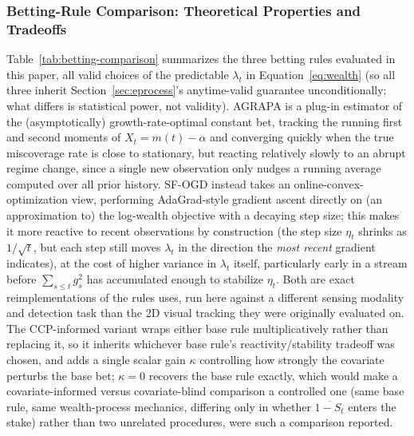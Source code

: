 \subsubsection{Betting-Rule Comparison: Theoretical Properties and Tradeoffs}
\label{sec:betting-comparison}
Table~\ref{tab:betting-comparison} summarizes the three betting rules evaluated in this paper, all valid choices of the predictable $\lambda_t$ in Equation~\ref{eq:wealth} (so all three inherit Section~\ref{sec:eprocess}'s anytime-valid guarantee unconditionally; what differs is statistical power, not validity). AGRAPA is a plug-in estimator of the (asymptotically) growth-rate-optimal constant bet, tracking the running first and second moments of $X_t = m(t)-\alpha$ and converging quickly when the true miscoverage rate is close to stationary, but reacting relatively slowly to an abrupt regime change, since a single new observation only nudges a running average computed over all prior history. SF-OGD instead takes an online-convex-optimization view, performing AdaGrad-style gradient ascent directly on (an approximation to) the log-wealth objective with a decaying step size; this makes it more reactive to recent observations by construction (the step size $\eta_t$ shrinks as $1/\sqrt{t}$, but each step still moves $\lambda_t$ in the direction the \emph{most recent} gradient indicates), at the cost of higher variance in $\lambda_t$ itself, particularly early in a stream before $\sum_{s\le t} g_s^2$ has accumulated enough to stabilize $\eta_t$. Both are exact reimplementations of the rules \cite{MonroyMunoz2026WACV} uses, run here against a different sensing modality and detection task than the 2D visual tracking they were originally evaluated on. The CCP-informed variant wraps either base rule multiplicatively rather than replacing it, so it inherits whichever base rule's reactivity/stability tradeoff was chosen, and adds a single scalar gain $\kappa$ controlling how strongly the covariate perturbs the base bet; $\kappa=0$ recovers the base rule exactly, which would make a covariate-informed versus covariate-blind comparison a controlled one (same base rule, same wealth-process mechanics, differing only in whether $\overline{1-S_t}$ enters the stake) rather than two unrelated procedures, were such a comparison reported.

